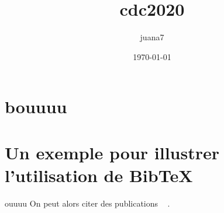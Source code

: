\documentclass{article}
\title{cdc2020}
\author{juana7 }
\begin{document}
\date\today
\maketitle

\section{bouuuu}

\section{Un exemple pour illustrer l'utilisation de BibTeX}

ouuuu On peut alors citer des publications ~\cite{Guéguen} .


\printbibliography  %
\end{document}
